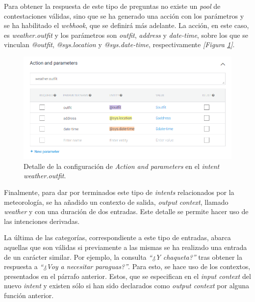 \documentclass[11pt,spanish,listoffigures]{tfgetsinf}
\begin{document}
Para obtener la respuesta de este tipo de preguntas no existe un \textit{pool} de contestaciones válidas, sino que se ha generado una acción con los parámetros y se ha habilitado el \textit{webhook}, que se definirá más adelante. La acción, en este caso, es \textit{weather.outfit} y los parámetros son \textit{outfit}, \textit{address} y \textit{date-time}, sobre los que se vinculan \textit{@outfit}, \textit{@sys.location} y \textit{@sys.date-time}, respectivamente \textit{[Figura \ref{fig:action-and-parameters1}]}. 

\begin{figure}[h!]
    \centering
    \includegraphics[width=1\textwidth]{images/img11.png}
    \caption{Detalle de la configuración de \textit{Action and parameters} en el \textit{intent weather.outfit}.}
    \label{fig:action-and-parameters1}
\end{figure}

Finalmente, para dar por terminados este tipo de \textit{intents} relacionados por la meteorología, se ha añadido un contexto de salida, \textit{output} \textit{context}, llamado \textit{weather} y con una duración de dos entradas. Este detalle se permite hacer uso de las intenciones derivadas.

La última de las categorías, correspondiente a este tipo de entradas, abarca aquellas que son válidas si previamente a las mismas se ha realizado una entrada de un carácter similar. Por ejemplo, la consulta \textit{“¿Y chaqueta?”} tras obtener la respuesta a \textit{“¿Voy a necesitar paraguas?”}. Para esto, se hace uso de los contextos, presentados en el párrafo anterior. Estos, que se especifican en el \textit{input context} del nuevo \textit{intent} y existen sólo si han sido declarados como \textit{output context} por alguna función anterior.
\end{document}

